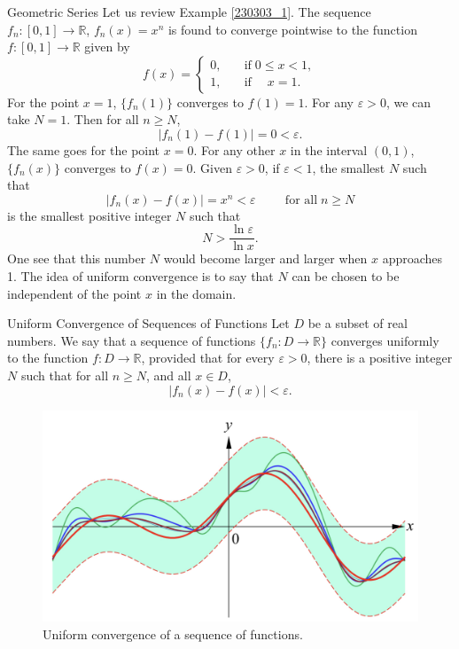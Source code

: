 \begin{example}[label=230305_16]{Geometric Series}
Let us   review Example \ref{230303_1}. The sequence $f_n:[0,1]\to\mathbb{R}$, $f_n(x)=x^n$ is found to converge pointwise to the function $f:[0,1]\to\mathbb{R}$ given by  \[f(x)=\begin{cases}0,\quad &\text{if}\;0\leq x<1,\\1,\quad &\text{if}\;\quad x=1.\end{cases}\]For the point $x=1$,  $\{f_n(1)\}$ converges to $f(1)=1$. For any $\varepsilon>0$, we can take $N=1$. Then for all $n\geq N$, \[|f_n(1)-f(1)|=0<\varepsilon.\] The same goes for the point  $x=0$. For any other $x$ in the interval $(0,1)$, $\{f_n(x)\}$ converges to $f(x)=0$. Given $\varepsilon>0$, if $\varepsilon<1$, the smallest $N$ such that
\[|f_n(x)-f(x)|=x^n<\varepsilon\hspace{1cm}\text{for all}\;n\geq N\] is the smallest positive integer $N$ such  that 
\[N>\frac{\ln\varepsilon}{\ln x}.\]
One see that this number $N$ would become larger and larger when $x$ approaches 1. The idea of uniform convergence is to say that $N$ can be chosen to be independent of the point $x$ in the domain.


\begin{definition}{Uniform Convergence of Sequences of Functions}
Let $D$ be a subset of real numbers. We say that a sequence of functions $\{f_n:D\to\mathbb{R}\}$ converges uniformly to the function $f:D\to\mathbb{R}$, provided that for every $\varepsilon>0$, there is a positive integer $N$ such that for all $n\geq N$, and all $x\in D$, 
\[|f_n(x)-f(x)|<\varepsilon.\]
\end{definition}


\begin{figure}[ht]
\centering
\includegraphics[scale=0.2]{Picture57.png}
\caption{Uniform convergence of a sequence of functions.\fa}\label{figure57}
\end{figure}



\end{example}
